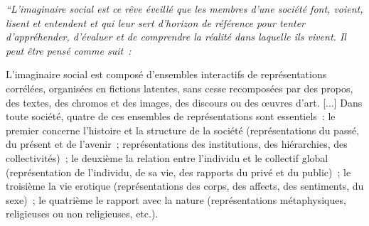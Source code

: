 \documentclass[letterpaper,portrait,12pt]{article}
\begin{document}
\textcolor[rgb]{0.000,0.000,0.000}{	}\emph{\textcolor[rgb]{0.000,0.000,0.000}{{``}}}\emph{\textcolor[rgb]{0.000,0.000,0.000}{L'imaginaire social est ce r\^{e}ve \'{e}veill\'{e} que les membres d'une soci\'{e}t\'{e} font, voient, lisent et entendent et qui leur sert d'horizon de r\'{e}f\'{e}rence pour tenter d'appr\'{e}hender, d'\'{e}valuer et de comprendre la r\'{e}alit\'{e} dans laquelle ils vivent. Il peut \^{e}tre pens\'{e} comme suit : }}





	L'imaginaire social est compos\'{e} d'ensembles interactifs de repr\'{e}sentations corr\'{e}l\'{e}es, organis\'{e}es en fictions latentes\hypertarget{bodyftn92}{}, sans cesse recompos\'{e}es par des propos, des textes, des chromos et des images, des discours ou des \oe{}uvres d'art. [...] Dans toute soci\'{e}t\'{e}, quatre de ces ensembles de repr\'{e}sentations sont essentiels : le premier concerne l'histoire et la structure de la soci\'{e}t\'{e} (repr\'{e}sentations du pass\'{e}, du pr\'{e}sent et de l'avenir ; repr\'{e}sentations des institutions, des hi\'{e}rarchies, des collectivit\'{e}s) ; le deuxi\`{e}me la relation entre l'individu et le collectif global (repr\'{e}sentation de l'individu, de sa vie, des rapports du priv\'{e} et du public) ; le troisi\`{e}me la vie erotique (repr\'{e}sentations des corps, des affects, des sentiments, du sexe) ; le quatri\`{e}me le rapport avec la nature (repr\'{e}sentations m\'{e}taphysiques, religieuses ou non religieuses, etc.).\\
\end{document}
